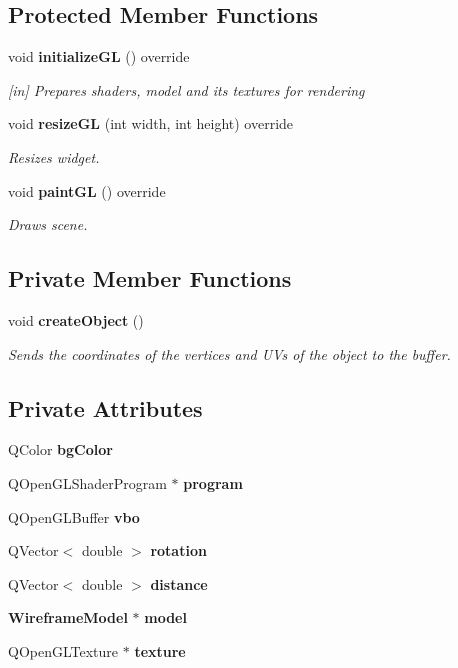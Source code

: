 \subsection*{Protected Member Functions}
\begin{DoxyCompactItemize}
\item 
void \textbf{ initialize\+GL} () override
\begin{DoxyCompactList}\small\item\em [in] Prepares shaders, model and it\textquotesingle{}s textures for rendering \end{DoxyCompactList}\item 
void \textbf{ resize\+GL} (int width, int height) override
\begin{DoxyCompactList}\small\item\em Resizes widget. \end{DoxyCompactList}\item 
void \textbf{ paint\+GL} () override
\begin{DoxyCompactList}\small\item\em Draws scene. \end{DoxyCompactList}\end{DoxyCompactItemize}
\subsection*{Private Member Functions}
\begin{DoxyCompactItemize}
\item 
void \textbf{ create\+Object} ()
\begin{DoxyCompactList}\small\item\em Sends the coordinates of the vertices and UV\textquotesingle{}s of the object to the buffer. \end{DoxyCompactList}\end{DoxyCompactItemize}
\subsection*{Private Attributes}
\begin{DoxyCompactItemize}
\item 
Q\+Color \textbf{ bg\+Color}
\item 
Q\+Open\+G\+L\+Shader\+Program $\ast$ \textbf{ program}
\item 
Q\+Open\+G\+L\+Buffer \textbf{ vbo}
\item 
Q\+Vector$<$ double $>$ \textbf{ rotation}
\item 
Q\+Vector$<$ double $>$ \textbf{ distance}
\item 
\textbf{ Wireframe\+Model} $\ast$ \textbf{ model}
\item 
Q\+Open\+G\+L\+Texture $\ast$ \textbf{ texture}
\end{DoxyCompactItemize}


